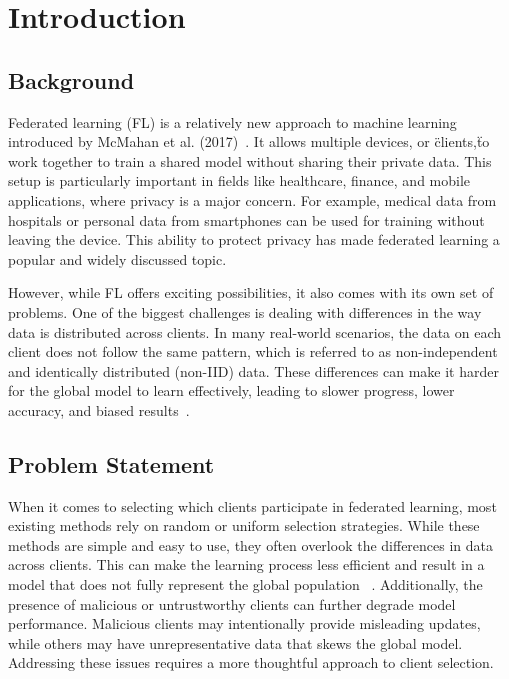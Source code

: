 \chapter{Introduction}

\section{Background}
Federated learning (FL) is a relatively new approach to machine learning
introduced by McMahan et al. (2017)~\cite{mcmahan2017communication}. It allows
multiple devices, or \"clients,\" to work together to train a shared model
without sharing their private data. This setup is particularly important in
fields like healthcare, finance, and mobile applications, where privacy is a
major concern. For example, medical data from hospitals or personal data from
smartphones can be used for training without leaving the device. This ability
to protect privacy has made federated learning a popular and widely discussed
topic.

However, while FL offers exciting possibilities, it also comes with its own set
of problems. One of the biggest challenges is dealing with differences in the
way data is distributed across clients. In many real-world scenarios, the data
on each client does not follow the same pattern, which is referred to as
non-independent and identically distributed (non-IID) data. These differences
can make it harder for the global model to learn effectively, leading to slower
progress, lower accuracy, and biased results~\cite{kairouz2021advances}.

\section{Problem Statement}
When it comes to selecting which clients participate in federated learning,
most existing methods rely on random or uniform selection strategies. While
these methods are simple and easy to use, they often overlook the differences
in data across clients. This can make the learning process less efficient and
result in a model that does not fully represent the global population
~\cite{zhao2018federated}. Additionally, the presence of malicious or
untrustworthy clients can further degrade model performance. Malicious clients
may intentionally provide misleading updates, while others may have
unrepresentative data that skews the global model. Addressing these issues
requires a more thoughtful approach to client selection.

